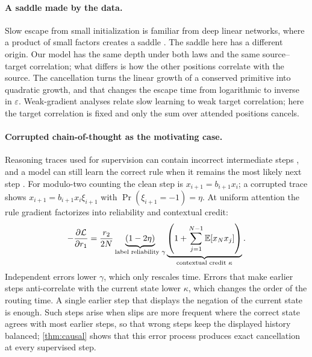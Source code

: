 \paragraph{A saddle made by the data.}
Slow escape from small initialization is familiar from deep linear networks, where a product of small factors creates a saddle
\citep{saxe2014exact,shamir2019exponential}. The saddle here has a different origin. Our model has the same depth under both laws and the same
source--target correlation; what differs is how the other positions correlate with the source. The cancellation turns the linear growth of a
conserved primitive into quadratic growth, and that changes the escape time from logarithmic to inverse in $\varepsilon$.
Weak-gradient analyses \citep{shalevshwartz2017failures,abbe2025parities} relate slow learning to weak target correlation; here the target correlation is fixed
and only the sum over attended positions cancels.

\paragraph{Corrupted chain-of-thought as the motivating case.}
Reasoning traces used for supervision can contain incorrect intermediate steps \citep{havrilla2024noise,zhou2024noisyrationales},
and a model can still learn the correct rule when it remains the most likely next step \citep{natarajan2013noisy,patrini2017loss}.
For modulo-two counting the clean step is $x_{i+1}=b_{i+1}x_i$; a corrupted trace shows $x_{i+1}=b_{i+1}x_i\xi_{i+1}$ with $\Pr(\xi_{i+1}=-1)=\eta$.
At uniform attention the rule gradient factorizes into reliability and contextual credit:
\[
 -\frac{\partial \mathcal L}{\partial r_1}
 =\frac{r_2}{2N}
 \underbrace{(1-2\eta)}_{\text{label reliability }\gamma}
 \underbrace{\left(1+\sum_{j=1}^{N-1}\mathbb E[x_Nx_j]\right)}_{\text{contextual credit }\kappa}.
\]
Independent errors lower $\gamma$, which only rescales time. Errors that make earlier steps anti-correlate with the current state lower $\kappa$,
which changes the order of the routing time. A single earlier step that displays the negation of the current state is enough.
Such steps arise when slips are more frequent where the correct state agrees with most earlier steps, so that wrong steps keep the displayed
history balanced; \cref{thm:causal} shows that this error process produces exact cancellation at every supervised step.

